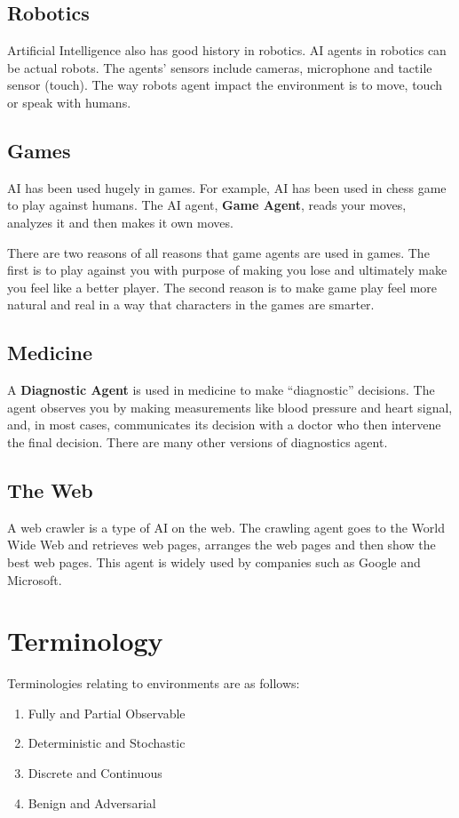 \documentclass[12pt]{article}
\begin{document}
\subsection*{Robotics}
Artificial Intelligence also has good history in robotics. AI agents in robotics can be actual robots. The agents' sensors include cameras, microphone and tactile sensor (touch). The way robots agent impact the environment is to move, touch or speak with humans.
\subsection*{Games}
AI has been used hugely in games. For example, AI has been used in chess game to play against humans. The AI agent, \textbf{Game Agent}, reads your moves, analyzes it and then makes it own moves. \par
There are two reasons of all reasons that game agents are used in games. The first is to play against you with purpose of making you lose and ultimately make you feel like a better player. The second reason is to make game play feel more natural and real in a way that characters in the games are smarter.
\subsection*{Medicine}
A \textbf{Diagnostic Agent} is used in medicine to make \enquote{diagnostic} decisions. The agent observes you by making measurements like blood pressure and heart signal, and, in most cases, communicates its decision with a doctor who then intervene the final decision. There are many other versions of diagnostics agent.
\subsection*{The Web}
A web crawler is a type of AI on the web. The crawling agent goes to the World Wide Web and retrieves web pages, arranges the web pages and then show the best web pages. This agent is widely used by companies such as Google and Microsoft.
\section*{Terminology}
Terminologies relating to environments are as follows:
\begin{enumerate}
\item Fully and Partial Observable
\item Deterministic and Stochastic
\item Discrete and Continuous
\item Benign and Adversarial
\end{enumerate}
\end{document}
